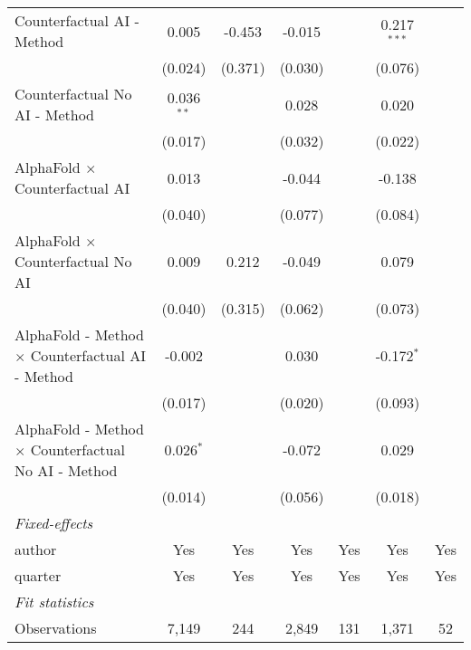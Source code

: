 \begin{tabular}{lcccccc}
   Counterfactual AI - Method                                 & 0.005        & -0.453  & -0.015  &         & 0.217$^{***}$  &   \\   
                                                              & (0.024)      & (0.371) & (0.030) &         & (0.076)        &   \\   
   Counterfactual No AI - Method                              & 0.036$^{**}$ &         & 0.028   &         & 0.020          &   \\   
                                                              & (0.017)      &         & (0.032) &         & (0.022)        &   \\   
   AlphaFold $\times$ Counterfactual AI                       & 0.013        &         & -0.044  &         & -0.138         &   \\   
                                                              & (0.040)      &         & (0.077) &         & (0.084)        &   \\   
   AlphaFold $\times$ Counterfactual No AI                    & 0.009        & 0.212   & -0.049  &         & 0.079          &   \\   
                                                              & (0.040)      & (0.315) & (0.062) &         & (0.073)        &   \\   
   AlphaFold - Method $\times$ Counterfactual AI - Method     & -0.002       &         & 0.030   &         & -0.172$^{*}$   &   \\   
                                                              & (0.017)      &         & (0.020) &         & (0.093)        &   \\   
   AlphaFold - Method $\times$ Counterfactual No AI - Method  & 0.026$^{*}$  &         & -0.072  &         & 0.029          &   \\   
                                                              & (0.014)      &         & (0.056) &         & (0.018)        &   \\   
   \midrule
   \emph{Fixed-effects}\\
   author                                                     & Yes          & Yes     & Yes     & Yes     & Yes            & Yes\\  
   quarter                                                    & Yes          & Yes     & Yes     & Yes     & Yes            & Yes\\  
   \midrule
   \emph{Fit statistics}\\
   Observations                                               & 7,149        & 244     & 2,849   & 131     & 1,371          & 52\\  

\end{tabular}
